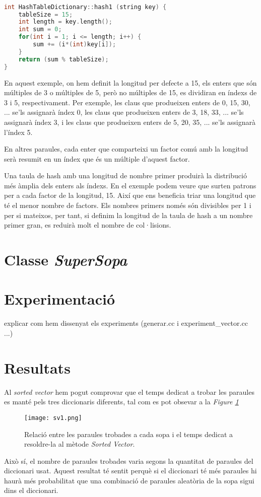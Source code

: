 \documentclass[titlepage]{article}
\begin{document}
\begin{lstlisting}[language=C++, caption=Funció de hash exemple]

int HashTableDictionary::hash1 (string key) {
    tableSize = 15;
    int length = key.length();
    int sum = 0;
    for(int i = 1; i <= length; i++) {
        sum += (i*(int)key[i]);
    }
    return (sum % tableSize);
}

\end{lstlisting}
En aquest exemple, on hem definit la longitud per defecte a 15, els enters que són múltiples de 3 o múltiples de 5, però no múltiples de 15, es dividiran en índexs de 3 i 5, respectivament. Per exemple, les claus que produeixen enters de 0, 15, 30, ... se'ls assignarà índex 0, les claus que produeixen enters de 3, 18, 33, ... se'ls assignarà índex 3, i les claus que produeixen enters de 5, 20, 35, ... se'ls assignarà l'índex 5. 
\newline\par
En altres paraules, cada enter que comparteixi un factor comú amb la longitud serà resumit en un índex que és un múltiple d'aquest factor.
\newline\par
Una taula de hash amb una longitud de nombre primer produirà la distribució més àmplia dels enters als índexs. En el exemple podem veure que surten patrons per a cada factor de la longitud, 15. Així que ens beneficia triar una longitud que té el menor nombre de factors. Els nombres primers només són divisibles per 1 i per si mateixos, per tant, si definim la longitud de la taula de hash a un nombre primer gran, es reduirà molt el nombre de col·lisions.

\clearpage
\section{Classe \textit{SuperSopa}}


\clearpage
\section{Experimentació}
explicar com hem dissenyat els experiments (generar.cc i experiment\_vector.cc ...)

\clearpage
\section{Resultats}
Al \textit{sorted vector} hem pogut comprovar que el temps dedicat a trobar les paraules es manté pels tres diccionaris diferents, tal com es pot obsevar a la \textit{Figure \ref{fig:sv1.png}}
\begin{figure}[H]
    \centering
    \texttt{[image: sv1.png]}
    \caption{Relació entre les paraules trobades a cada sopa i el temps dedicat a resoldre-la al mètode \textit{Sorted Vector}.}
    \label{fig:sv1.png}
\end{figure}
Això sí, el nombre de paraules trobades varia segons la quantitat de paraules del diccionari usat. Aquest resultat té sentit perquè si el diccionari té més paraules hi haurà més probabilitat que una combinació de paraules aleatòria de la sopa sigui dins el diccionari.\newline
\end{document}
